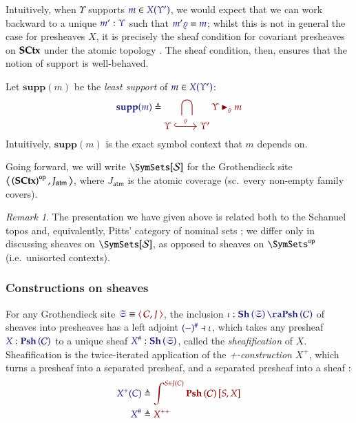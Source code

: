\documentclass[11pt]{article}
\theoremstyle{definition}
\theoremstyle{remark}
\newtheorem{remark}[thm]{Remark}
\numberwithin{equation}{section}
\newcommand\Supp[1]{\mathbf{supp}(#1)}
\newcommand\SupportsUnmoded[3]{#1 \blacktriangleright_{#2} #3}
\newcommand\Sheaves[1]{\mathbf{Sh}\left(#1\right)}
\newcommand\Presheaves[1]{\mathbf{Psh}\left(#1\right)}
\newcommand\Sheafify[1]{#1^{\#}}
\newcommand\SCtxSite{\SymSets[\Sorts]}
\begin{document}
Intuitively, when $\Upsilon$ supports $\Member{m}{X(\Upsilon')}$, we would
expect that we can work backward to a unique $\Of{m'}{\Upsilon}$ such that
$\IsEq{m'\varrho}{m}$; whilst this is not in general the case for presheaves
$X$, it is precisely the sheaf condition for covariant presheaves on $\mathbf{SCtx}$
under the atomic topology \cite[p.~126]{mac-lane-moerdijk:1992}. The sheaf
condition, then, ensures that the notion of support is well-behaved.

Let $\Supp{m}$ be the \emph{least support} of $\Member{m}{X(\Upsilon')}$:
\[
  \Define{\Supp{m}}{
    \bigcap_{
      \begin{tikzcd}[cramped, ampersand replacement = \&]
        \Upsilon\arrow[r, hook, "\varrho"] \& \Upsilon'
      \end{tikzcd}
    }
    \SupportsUnmoded{\Upsilon}{\varrho}{m}
  }
\]
Intuitively, $\Supp{m}$ is the exact symbol context that $m$ depends on.

Going forward, we will write $\SCtxSite$ for the Grothendieck site
$\left\langle\,\left(\mathbf{SCtx}\right)^{\mathtt{op}},J_\mathsf{atm}\,\right\rangle$, where $J_\mathsf{atm}$
is the atomic coverage (sc.\ every non-empty family covers).

\begin{remark}
  The presentation we have given above is related both to the Schanuel topos
  and, equivalently, Pitts' category of nominal sets \cite{fiore-staton:2006,
  pitts:2013}; we differ only in discussing sheaves on $\SCtxSite$, as opposed
  to sheaves on $\OpCat{\SymSets}$ (i.e.\ unisorted contexts).
\end{remark}

\subsubsection{Constructions on sheaves}

For any Grothendieck site $\Match{\mathfrak{S}}{\Pair{\mathcal{C}}{J}}$, the
inclusion $\Of{\iota}{\Sheaves{\mathfrak{S}}\ra\Presheaves{\mathcal{C}}}$ of
sheaves into presheaves has a left adjoint
$\IMode{\Sheafify{(-)}}\dashv\IMode{\iota}$, which takes any presheaf
$\Of{X}{\Presheaves{\mathcal{C}}}$ to a unique sheaf
$\Of{\Sheafify{X}}{\Sheaves{\mathfrak{S}}}$, called the \emph{sheafification}
of $X$. Sheafification is the twice-iterated application of the
\emph{+-construction} $X^+$, which turns a presheaf into a separated presheaf,
and a separated presheaf into a sheaf \cite{mac-lane-moerdijk:1992}:
\begin{align*}
  \ADefine{
    X^+(C)
  }{
    \int^{S\in J(C)}
    \Hom{\Presheaves{\mathcal{C}}}{S}{X}
  }\\
  \ADefine{
    \Sheafify{X}
  }{
    X^{++}
  }
\end{align*}
\end{document}

